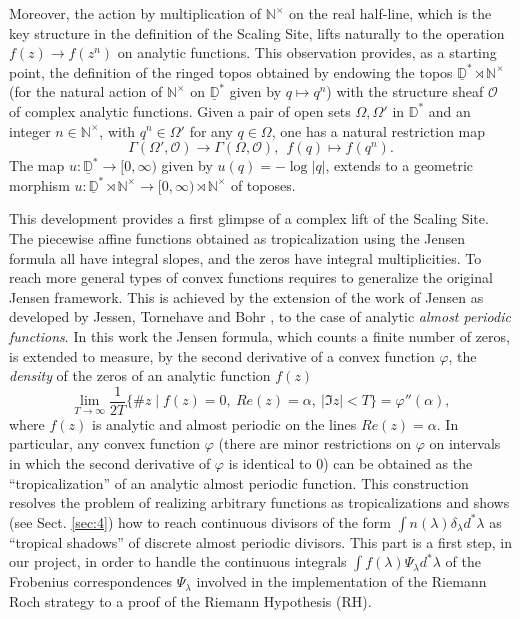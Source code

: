 \documentclass[graybox, envcountsect%
]{svmult}
\def\D{{\mathbb D}}
\def\N{{\mathbb N}}
\def\cO{{\mathcal O}}
\def\dst{{\underline \D^*}}
\def\no{\noindent}
\def\nt{\N^{\times}}
\def\rnt{{[0,\infty)\rtimes{\N^{\times}}}}
\begin{document}
  \no Moreover, the action by multiplication of $\nt$ on the real half-line, which is the key structure in the definition of the Scaling Site, lifts naturally to the operation  $f(z) \to f(z^n)$ on analytic functions. This observation provides, as a starting point, the definition of the ringed topos obtained  by endowing the topos $\dst\rtimes \nt$ (for the natural action of $\nt$ on $\dst$ given by $q\mapsto q^n$) with the structure sheaf $\cO$ of complex analytic functions. Given a pair of open sets $\Omega,\Omega'$ in $\D^*$ and an integer $n\in \nt$, with $q^n\in \Omega'$ for any $q\in \Omega$, one has a natural restriction map 
$$
\Gamma(\Omega',\cO)\to \Gamma(\Omega,\cO), \ \ f(q)\mapsto f(q^n).
$$
 The map $u:\dst\to [0,\infty)$ given by $u(q)=-\log\vert q\vert$, extends to a geometric morphism $u:\dst\rtimes \nt\to \rnt$ of toposes.

 
 \no This development provides a first glimpse of a complex lift of the Scaling Site.   
 The piecewise affine functions obtained as tropicalization using the Jensen formula all have integral slopes, and the   zeros have integral multiplicities. To reach more general types of convex functions requires to generalize the original Jensen framework. This is achieved by the extension of the work of Jensen as developed by Jessen, Tornehave and Bohr \cite{bohr,jessen33,JT},  to the case of analytic \emph{almost periodic functions}. In this work  the Jensen formula, which counts a finite number of zeros, is extended  to measure, by the second derivative of a convex function $\varphi$,   the \emph{density} of the zeros of an analytic function $f(z)$ 
 $$\lim_{T\to \infty} \frac{1}{2T}\{\# z\mid f(z)=0,\ Re(z) = \alpha,\  |\Im z|<T\}=\varphi''(\alpha),$$
  where $f(z)$ is analytic and almost periodic on the lines $Re(z) = \alpha$. In particular, any convex function $\varphi$ (there are  minor restrictions on $\varphi$  on intervals in which the second derivative of $\varphi$ is identical to $0$) can be obtained as the ``tropicalization'' of an analytic almost periodic function. This construction resolves the problem of realizing arbitrary functions  as tropicalizations and shows (see Sect. \ref{sec:4}) how to reach continuous divisors of the form $\int n(\lambda)\delta_\lambda d^*\lambda$ as ``tropical shadows'' of discrete almost periodic divisors. This part is a first step, in our project, in order  to handle the continuous integrals $\int f(\lambda)\Psi_\lambda d^*\lambda$ of the Frobenius correspondences  $\Psi_\lambda$ involved in the implementation of the Riemann Roch strategy to a proof of the Riemann Hypothesis (RH).\vspace{.03in}
\end{document}
